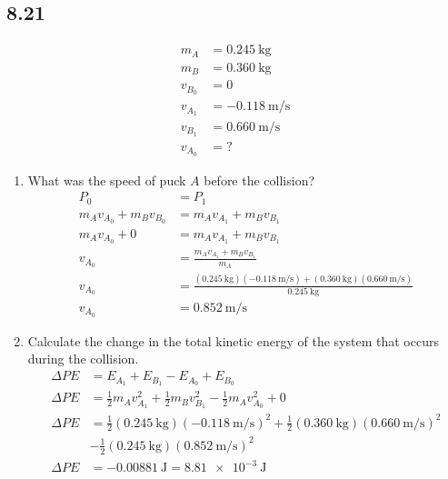 \documentclass{article}
\begin{document}
\subsection{8.21}

\begin{align*}
	m_A & = \SI{0.245}{\kilogram} \\
	m_B & = \SI{0.360}{\kilogram} \\
	v_{B_0} & = 0 \\
	v_{A_1} & = \SI{-0.118}{\meter \per \second} \\
	v_{B_1} & = \SI{0.660}{\meter \per \second} \\
	v_{A_0} & = ?
\end{align*}
\begin{enumerate}[label = \textbf{(\alph*)}]
	\item What was the speed of puck $ A $ before the collision?
		\begin{align*}
			P_0 & = P_1 \\
			m_A v_{A_0} + m_B v_{B_0} & = m_A v_{A_1} + m_B v_{B_1} \\
			m_A v_{A_0} + 0 & = m_A v_{A_1} + m_B v_{B_1} \\
			v_{A_0} & = \frac{ m_A v_{A_1} + m_B v_{B_1} }{ m_A } \\
			v_{A_0} & = \frac{ (\SI{0.245}{\kilogram})(\SI{-0.118}{\meter \per \second}) + (\SI{0.360}{\kilogram})(\SI{0.660}{\meter \per \second}) }{ \SI{0.245}{\kilogram} } \\
			v_{A_0} & = \SI{0.852}{\meter \per \second}
		\end{align*}
	\item Calculate the change in the total kinetic energy of the system that occurs during the collision.
		\begin{align*}
			\Delta PE & = E_{A_1} + E_{B_1} - E_{A_0} + E_{B_0} \\
			\Delta PE & = \frac{1}{2}m_Av_{A_1}^2 + \frac{1}{2}m_Bv_{B_1}^2 - \frac{1}{2}m_Av_{A_0}^2 + 0 \\
			\Delta PE & = \frac{1}{2}(\SI{0.245}{\kilogram})(\SI{-0.118}{\meter \per \second})^2 + \frac{1}{2}(\SI{0.360}{\kilogram})(\SI{0.660}{\meter \per \second})^2 \\
					  & - \frac{1}{2}(\SI{0.245}{\kilogram})(\SI{0.852}{\meter \per \second})^2 \\
			\Delta PE & = \SI{-0.00881}{\joule} = \SI{8.81e-3}{\joule}
		\end{align*}
\end{enumerate}
\end{document}
